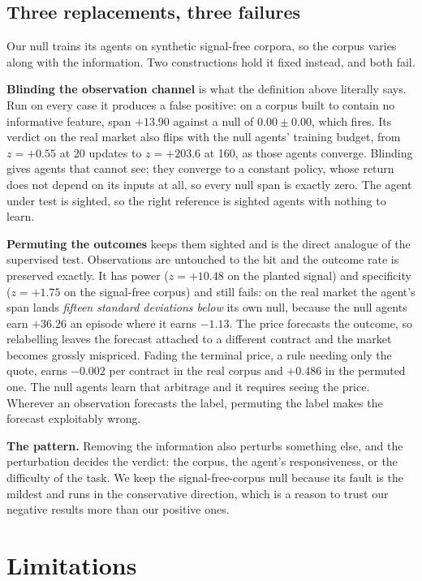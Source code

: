 \documentclass[10pt,twocolumn]{article}
\begin{document}
\subsection{Three replacements, three failures}
\label{sec:cost}

Our null trains its agents on synthetic signal-free corpora, so the corpus
varies along with the information. Two constructions hold it fixed instead, and
both fail.

\textbf{Blinding the observation channel} is what the definition above literally
says. Run on every case it produces a false positive: on a corpus built to
contain no informative feature, span $+13.90$ against a null of
$0.00 \pm 0.00$, which fires. Its verdict on the real market also flips with the
null agents' training budget, from $z=+0.55$ at 20 updates to $z=+203.6$ at 160,
as those agents converge. Blinding gives agents that cannot see; they converge
to a constant policy, whose return does not depend on its inputs at all, so
every null span is exactly zero. The agent under test is sighted, so the right
reference is sighted agents with nothing to learn.

\textbf{Permuting the outcomes} keeps them sighted and is the direct analogue of
the supervised test. Observations are untouched to the bit and the outcome rate
is preserved exactly. It has power ($z=+10.48$ on the planted signal) and
specificity ($z=+1.75$ on the signal-free corpus) and still fails: on the real
market the agent's span lands \emph{fifteen standard deviations below} its own
null, because the null agents earn $+36.26$ an episode where it earns $-1.13$.
The price forecasts the outcome, so relabelling leaves the forecast attached to
a different contract and the market becomes grossly mispriced. Fading the
terminal price, a rule needing only the quote, earns $-0.002$ per contract in
the real corpus and $+0.486$ in the permuted one. The null agents learn that
arbitrage and it requires seeing the price. Wherever an observation forecasts
the label, permuting the label makes the forecast exploitably wrong.

\textbf{The pattern.} Removing the information also perturbs something else, and
the perturbation decides the verdict: the corpus, the agent's responsiveness, or
the difficulty of the task. We keep the signal-free-corpus null because its
fault is the mildest and runs in the conservative direction, which is a reason
to trust our negative results more than our positive ones.

\section{Limitations}
\end{document}
